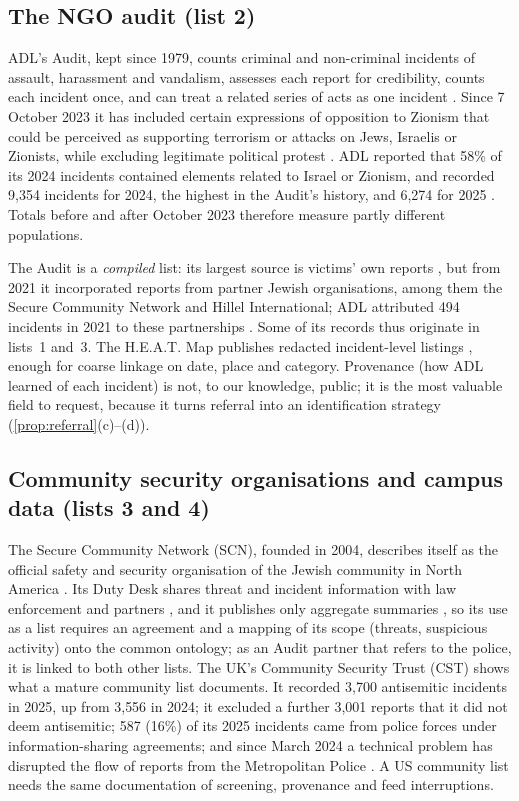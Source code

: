 \subsection{The NGO audit (list 2)}\label{sec:src-audit}

ADL's Audit, kept since 1979, counts criminal and non-criminal incidents of assault, harassment and vandalism, assesses each report for credibility, counts each incident once, and can treat a related series of acts as one incident \citep{adl2025audit,adl2026audit}. Since 7 October 2023 it has included certain expressions of opposition to Zionism that could be perceived as supporting terrorism or attacks on Jews, Israelis or Zionists, while excluding legitimate political protest \citep{adl2025audit,adl2026audit}. ADL reported that 58\% of its 2024 incidents contained elements related to Israel or Zionism, and recorded 9{,}354 incidents for 2024, the highest in the Audit's history, and 6{,}274 for 2025 \citep{adl2025audit,adl2026audit}. Totals before and after October 2023 therefore measure partly different populations.

The Audit is a \emph{compiled} list: its largest source is victims' own reports \citep{adl2025audit}, but from 2021 it incorporated reports from partner Jewish organisations, among them the Secure Community Network and Hillel International; ADL attributed 494 incidents in 2021 to these partnerships \citep{adl2022audit}. Some of its records thus originate in lists~1 and~3. The H.E.A.T. Map publishes redacted incident-level listings \citep{adlheatmap}, enough for coarse linkage on date, place and category. Provenance (how ADL learned of each incident) is not, to our knowledge, public; it is the most valuable field to request, because it turns referral into an identification strategy (\cref{prop:referral}(c)--(d)).

\subsection{Community security organisations and campus data (lists 3 and 4)}\label{sec:src-community}

The Secure Community Network (SCN), founded in 2004, describes itself as the official safety and security organisation of the Jewish community in North America \citep{scnwho}. Its Duty Desk shares threat and incident information with law enforcement and partners \citep{scnmonitoring}, and it publishes only aggregate summaries \citep{scn2024monthly}, so its use as a list requires an agreement and a mapping of its scope (threats, suspicious activity) onto the common ontology; as an Audit partner that refers to the police, it is linked to both other lists. The UK's Community Security Trust (CST) shows what a mature community list documents. It recorded 3{,}700 antisemitic incidents in 2025, up from 3{,}556 in 2024; it excluded a further 3{,}001 reports that it did not deem antisemitic; 587 (16\%) of its 2025 incidents came from police forces under information-sharing agreements; and since March 2024 a technical problem has disrupted the flow of reports from the Metropolitan Police \citep{cst2026incidents}. A US community list needs the same documentation of screening, provenance and feed interruptions.

